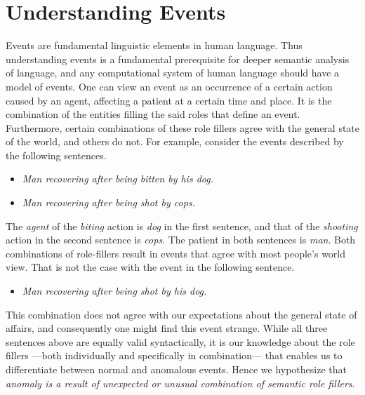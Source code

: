 \section{Understanding Events}
Events are fundamental linguistic elements in human language. Thus understanding 
events is a fundamental prerequisite for deeper semantic 
analysis of language, and any computational system of human language should
have a model of events. One can view an event as an occurrence of a certain 
action caused
by an agent, affecting a patient at a certain time and place. It is 
the combination of the entities
filling the said roles that define an event. Furthermore, certain combinations 
of these role fillers
agree with the general state of the world, and others do not. For example, 
consider the events described by the following
sentences.
\begin{itemize}
 \item[] \textit{Man recovering after being bitten by his dog.}
 \item[] \textit{Man recovering after being shot by cops.}
\end{itemize}
The \textit{agent} of the \textit{biting} action is \textit{dog} in the first 
sentence, and that of the \textit{shooting}
action in the second sentence is \textit{cops}. The patient in both sentences is 
\textit{man}.
Both combinations of role-fillers result in events that agree with most people's 
world view. That is not the case with
the event in the following sentence.
\begin{itemize}
 \item[] \textit{Man recovering after being shot by his dog.}
\end{itemize}
This combination does not agree with our expectations about the general state of 
affairs, and consequently one
might find this event strange. While all three sentences above are equally
valid syntactically, it 
is our knowledge about the role fillers 
---both individually and specifically in combination---  
that enables us to 
differentiate between normal and anomalous events.  Hence we hypothesize that
\emph{anomaly is a result of unexpected or 
unusual combination of semantic role fillers}.

